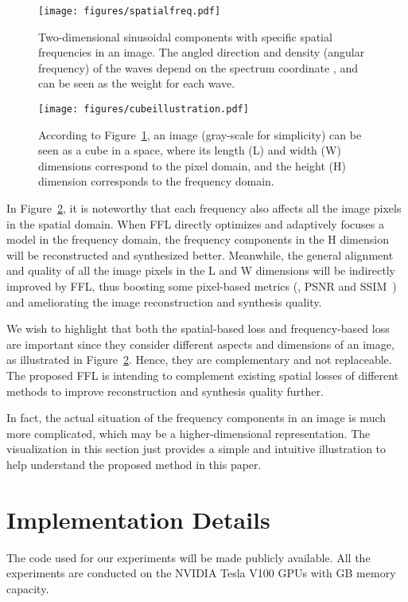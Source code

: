 \documentclass[10pt,twocolumn,letterpaper]{article}
\begin{document}
\begin{figure}[t]
	\centering
\texttt{[image: figures/spatialfreq.pdf]}
\caption{Two-dimensional sinusoidal components with specific spatial frequencies in an image. The angled direction and density (angular frequency) of the waves depend on the spectrum coordinate , and  can be seen as the weight for each wave.}
	\label{fig:spatialfreq}
	\vspace{-0.1cm}
\end{figure}


\begin{figure}[t]
	\centering
\texttt{[image: figures/cubeillustration.pdf]}
\caption{According to Figure~\ref{fig:spatialfreq}, an image (gray-scale for simplicity) can be seen as a cube in a space, where its length (L) and width (W) dimensions correspond to the pixel domain, and the height (H) dimension corresponds to the frequency domain.}
	\label{fig:cubeillustration}
	\vspace{-0.3cm}
\end{figure}


In Figure~\ref{fig:cubeillustration}, it is noteworthy that each frequency also affects all the image pixels in the spatial domain. When FFL directly optimizes and adaptively focuses a model in the frequency domain, the frequency components in the H dimension will be reconstructed and synthesized better. Meanwhile, the general alignment and quality of all the image pixels in the L and W dimensions will be indirectly improved by FFL, thus boosting some pixel-based metrics (\eg, PSNR and SSIM~\cite{ssim}) and ameliorating the image reconstruction and synthesis quality.

We wish to highlight that both the spatial-based loss and frequency-based loss are important since they consider different aspects and dimensions of an image, as illustrated in Figure~\ref{fig:cubeillustration}. Hence, they are complementary and not replaceable. The proposed FFL is intending to complement existing spatial losses of different methods to improve reconstruction and synthesis quality further.

In fact, the actual situation of the frequency components in an image is much more complicated, which may be a higher-dimensional representation. The visualization in this section just provides a simple and intuitive illustration to help understand the proposed method in this paper.



\section{Implementation Details}
\label{sec:implementation}
The code used for our experiments will be made publicly available.
All the experiments are conducted on the NVIDIA Tesla V100 GPUs with  GB memory capacity.
\end{document}
